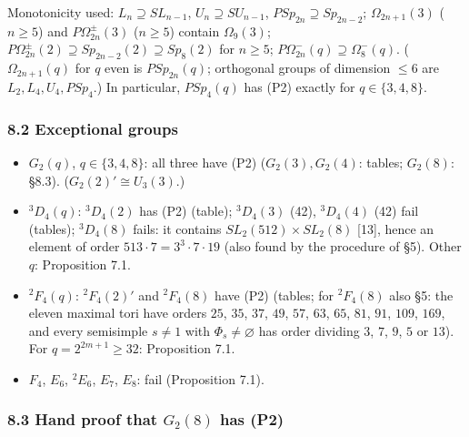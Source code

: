 \documentclass[11pt,a4paper]{article}
\providecommand{\tightlist}{\setlength{\itemsep}{1pt}\setlength{\parskip}{0pt}}
\begin{document}
Monotonicity used: \(L_n\supseteq SL_{n-1}\), \(U_n\supseteq SU_{n-1}\),
\(PSp_{2n}\supseteq Sp_{2n-2}\); \(\Omega_{2n+1}(3)\) (\(n\ge5\)) and
\(P\Omega^\pm_{2n}(3)\) (\(n\ge5\)) contain \(\Omega_9(3)\);
\(P\Omega^\pm_{2n}(2)\supseteq Sp_{2n-2}(2)\supseteq Sp_8(2)\) for
\(n\ge5\); \(P\Omega^-_{2n}(q)\supseteq\Omega^-_8(q)\).
(\(\Omega_{2n+1}(q)\) for \(q\) even is \(PSp_{2n}(q)\); orthogonal
groups of dimension \(\le6\) are \(L_2,L_4,U_4,PSp_4\).) In particular,
\(PSp_4(q)\) has (P2) exactly for \(q\in\{3,4,8\}\).

\subsubsection{8.2 Exceptional groups}\label{exceptional-groups}

\begin{itemize}
\tightlist
\item
  \(G_2(q)\), \(q\in\{3,4,8\}\): all three have (P2) (\(G_2(3),G_2(4)\):
  tables; \(G_2(8)\): §8.3). (\(G_2(2)'\cong U_3(3)\).)
\item
  \({}^3D_4(q)\): \({}^3D_4(2)\) has (P2) (table); \({}^3D_4(3)\) (42),
  \({}^3D_4(4)\) (42) fail (tables); \({}^3D_4(8)\) fails: it contains
  \(SL_2(512)\times SL_2(8)\) {[}13{]}, hence an element of order
  \(513\cdot7=3^3\cdot7\cdot19\) (also found by the procedure of §5).
  Other \(q\): Proposition 7.1.
\item
  \({}^2F_4(q)\): \({}^2F_4(2)'\) and \({}^2F_4(8)\) have (P2) (tables;
  for \({}^2F_4(8)\) also §5: the eleven maximal tori have orders
  \(25\), \(35\), \(37\), \(49\), \(57\), \(63\), \(65\), \(81\),
  \(91\), \(109\), \(169\), and every semisimple \(s\ne1\) with
  \(\Phi_s\neq\varnothing\) has order dividing \(3\), \(7\), \(9\),
  \(5\) or \(13\)). For \(q=2^{2m+1}\ge32\): Proposition 7.1.
\item
  \(F_4\), \(E_6\), \({}^2E_6\), \(E_7\), \(E_8\): fail (Proposition
  7.1).
\end{itemize}

\subsubsection{\texorpdfstring{8.3 Hand proof that \(G_2(8)\) has
(P2)}{8.3 Hand proof that G\_2(8) has (P2)}}\label{hand-proof-that-g_28-has-p2}
\end{document}
